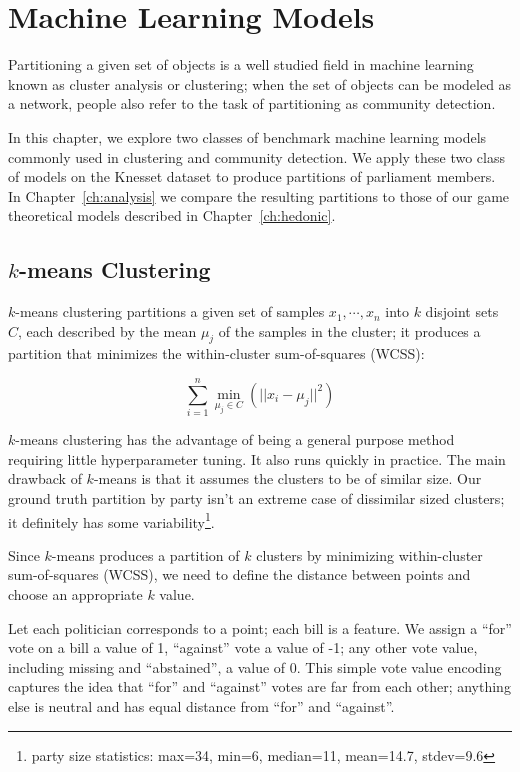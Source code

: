 
\chapter{Machine Learning Models}
\label{ch:comparison}
\vspace{2em}

Partitioning a given set of objects is a well studied field in machine learning
known as cluster analysis or clustering;
when the set of objects can be modeled as a network, people also refer to the
task of partitioning as community detection.

In this chapter, we explore two classes of benchmark machine learning models
commonly used in clustering and community detection.
We apply these two class of models on the Knesset dataset to produce partitions
of parliament members.
In Chapter~\ref{ch:analysis} we compare the resulting partitions to those of our
game theoretical models described in Chapter~\ref{ch:hedonic}.


\section{$k$-means Clustering}
\label{sec:k_means_clustering}

$k$-means clustering partitions a given set of samples $x_1, \cdots, x_n$ into
$k$ disjoint sets $C$, each described by the mean $\mu_j$ of the samples in the
cluster;
it produces a partition that minimizes the within-cluster sum-of-squares (WCSS):

\[
    \sum_{i=1}^{n} \underset{\mu_j \in C}{\min}(||x_i - \mu_j||^2)
\]

$k$-means clustering has the advantage of being a general purpose method
requiring little hyperparameter tuning. It also runs quickly in practice.
The main drawback of $k$-means is that it assumes the clusters to be of similar size.
Our ground truth partition by party isn't an extreme case of dissimilar sized
clusters; it definitely has some variability\footnote{party size statistics:
max=34, min=6, median=11, mean=14.7, stdev=9.6}.

Since $k$-means produces a partition of $k$ clusters by minimizing within-cluster
sum-of-squares (WCSS), we need to define the distance between points and choose
an appropriate $k$ value.

Let each politician corresponds to a point; each bill is a feature.
We assign a ``for'' vote on a bill a value of 1, ``against'' vote a value of -1;
any other vote value, including missing and ``abstained'', a value of 0.
This simple vote value encoding captures the idea that ``for'' and ``against''
votes are far from each other; anything else is neutral and has equal distance
from ``for'' and ``against''.

